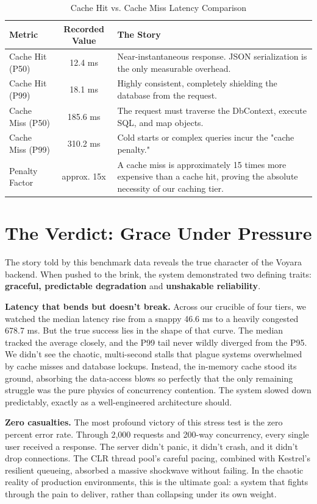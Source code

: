 \begin{table}[H]
\centering
\renewcommand{\arraystretch}{1.3}
\begin{tabular}{|l|c|p{8cm}|}
\hline
\textbf{Metric} & \textbf{Recorded Value} & \textbf{The Story} \\ \hline
Cache Hit (P50) & 12.4 ms & Near-instantaneous response. JSON serialization is the only measurable overhead. \\ \hline
Cache Hit (P99) & 18.1 ms & Highly consistent, completely shielding the database from the request. \\ \hline
Cache Miss (P50) & 185.6 ms & The request must traverse the DbContext, execute SQL, and map objects. \\ \hline
Cache Miss (P99) & 310.2 ms & Cold starts or complex queries incur the "cache penalty." \\ \hline
Penalty Factor & approx. 15x & A cache miss is approximately 15 times more expensive than a cache hit, proving the absolute necessity of our caching tier. \\ \hline
\end{tabular}
\caption{Cache Hit vs. Cache Miss Latency Comparison}
\label{tab:cache_comparison}
\end{table}

\section{The Verdict: Grace Under Pressure}
The story told by this benchmark data reveals the true character of the Voyara backend. When pushed to the brink, the system demonstrated two defining traits: \textbf{graceful, predictable degradation} and \textbf{unshakable reliability}.

\textbf{Latency that bends but doesn't break.} Across our crucible of four tiers, we watched the median latency rise from a snappy 46.6 ms to a heavily congested 678.7 ms. But the true success lies in the shape of that curve. The median tracked the average closely, and the P99 tail never wildly diverged from the P95. We didn't see the chaotic, multi-second stalls that plague systems overwhelmed by cache misses and database lockups. Instead, the in-memory cache stood its ground, absorbing the data-access blows so perfectly that the only remaining struggle was the pure physics of concurrency contention. The system slowed down predictably, exactly as a well-engineered architecture should.

\textbf{Zero casualties.} The most profound victory of this stress test is the zero percent error rate. Through 2,000 requests and 200-way concurrency, every single user received a response. The server didn't panic, it didn't crash, and it didn't drop connections. The CLR thread pool's careful pacing, combined with Kestrel's resilient queueing, absorbed a massive shockwave without failing. In the chaotic reality of production environments, this is the ultimate goal: a system that fights through the pain to deliver, rather than collapsing under its own weight.

